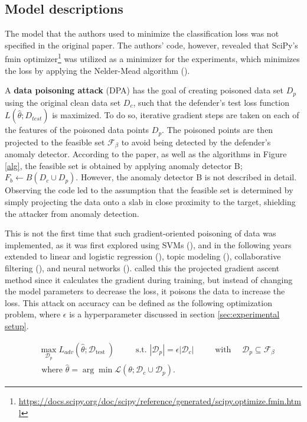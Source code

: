 \subsection{Model descriptions}
\label{model description}

The model that the authors used to minimize the classification loss was not specified in the original paper. 
The authors' code, however, revealed that SciPy's fmin optimizer\footnote{\href{https://docs.scipy.org/doc/scipy/reference/generated/scipy.optimize.fmin.html}{https://docs.scipy.org/doc/scipy/reference/generated/scipy.optimize.fmin.html}} was utilized as a minimizer for the experiments, which minimizes the loss by applying the Nelder-Mead algorithm (\cite{neldermead}). 

A \textbf{data poisoning attack} (DPA) has the goal of creating poisoned data set $D_p$ using the original clean data set $D_c$, such that the defender’s test loss function $L(\hat{\theta}; D_{test})$ is maximized. 
To do so, iterative gradient steps are taken on each of the features of the poisoned data points $D_p$.
The poisoned points are then projected to the feasible set $\mathcal F_\beta$ to avoid being detected by the defender's anomaly detector.
According to the paper, as well as the algorithms in Figure \ref{alg}, the feasible set is obtained by applying anomaly detector B; $F_b \leftarrow B(D_c \cup D_p)$. However, the anomaly detector B is not described in detail.
Observing the code led to the assumption that the feasible set is determined by simply projecting the data onto a slab in close proximity to the target, shielding the attacker from anomaly detection. 

This is not the first time that such gradient-oriented poisoning of data was implemented, as it was first explored using SVMs (\cite{biggio2013SVM}), and in the following years extended to linear and logistic regression (\cite{Mei2015b}), topic modeling (\cite{meizhure2015a}), collaborative filtering (\cite{li2016data}), and neural networks (\cite{koh2017understanding, munozgonzalez2017poisoning, yang2017generative}).
\cite{koh2017understanding} called this the projected gradient ascent method since it calculates the gradient during training, but instead of changing the model parameters to decrease the loss, it poisons the data to increase the loss. This attack on accuracy can be defined as the following optimization problem, where $\epsilon$ is a hyperparameter discussed in section \ref{sec:experimental setup}.

\begin{equation}
\begin{aligned}
&\max _{\mathcal{D}_{p}} L_{a d v}\left(\hat{\theta} ; \mathcal{D}_{\text {test }}\right) 
\;\;\;\;\;\;\;\; \text { s.t. }\left|\mathcal{D}_{p}\right|=\epsilon\left|\mathcal{D}_{c}\right| \;\;\;\;\;\;\;\; \text { with } \quad \mathcal{D}_{p} \subseteq \mathcal{F}_{\beta}  \\
&\text { where } \hat{\theta}=\arg \min \mathcal{L}\left(\theta ; \mathcal{D}_{c} \cup \mathcal{D}_{p}\right).
\end{aligned}
\end{equation}



